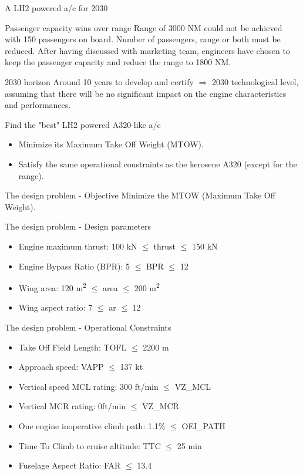 \documentclass[aspectratio=169]{beamer}
\begin{document}
\begin{frame}{A LH2 powered a/c for 2030}
    \begin{block}{Passenger capacity wins over range}
    Range of 3000 NM could not be achieved with 150 passengers on board.
    Number of passengers, range or both must be reduced.
    After having discussed with marketing team,
    engineers have chosen to keep the passenger capacity and reduce the range to 1800 NM\@.
    \end{block}
    \begin{block}{2030 horizon}
    Around 10 years to develop and certify $\Rightarrow$ 2030 technological level,
    assuming that there will be no significant impact on the engine characteristics and performances.
    \end{block}
    \begin{block}{Find the "best" LH2 powered A320-like a/c}
        \begin{itemize}
            \item Minimize its Maximum Take Off Weight (MTOW).
            \item Satisfy the same operational constraints as the kerosene A320 (except for the range).
        \end{itemize}
    \end{block}
\end{frame}
\begin{frame}{The design problem - Objective}
    Minimize the MTOW (Maximum Take Off Weight).
\end{frame}
\begin{frame}{The design problem - Design parameters}
    \begin{itemize}
        \item Engine maximum thrust: 100 kN $\leq$ thrust $\leq$ 150 kN
        \item Engine Bypass Ratio (BPR): 5 $\leq$ BPR $\leq$ 12
        \item Wing area: 120 m\textsuperscript{2} $\leq$ area $\leq$ 200 m\textsuperscript{2}
        \item Wing aspect ratio: 7 $\leq$ ar $\leq$ 12
    \end{itemize}
\end{frame}
\begin{frame}{The design problem - Operational Constraints}
    \begin{itemize}
        \item Take Off Field Length: TOFL $\leq$ 2200 m
        \item Approach speed: VAPP $\leq$ 137 kt
        \item Vertical speed MCL rating: 300 ft/min $\leq$ VZ\_MCL
        \item Vertical MCR rating: 0ft/min $\leq$ VZ\_MCR
        \item One engine inoperative climb path: 1.1\% $\leq$ OEI\_PATH
        \item Time To Climb to cruise altitude: TTC $\leq$ 25 min
        \item Fuselage Aspect Ratio: FAR $\leq$ 13.4
    \end{itemize}
\end{frame}
\end{document}

